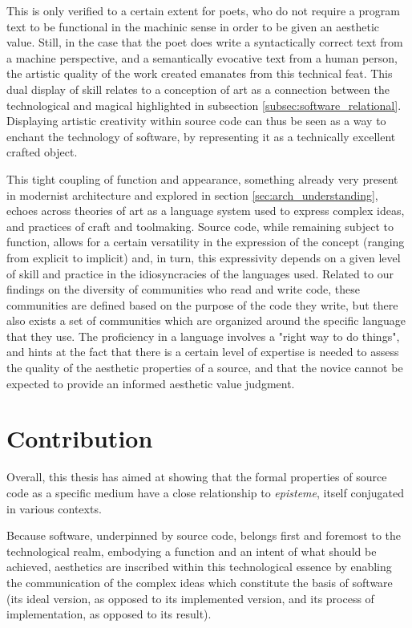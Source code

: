This is only verified to a certain extent for poets, who do not require a program text to be functional in the machinic sense in order to be given an aesthetic value. Still, in the case that the poet does write a syntactically correct text from a machine perspective, and a semantically evocative text from a human person, the artistic quality of the work created emanates from this technical feat. This dual display of skill relates to a conception of art as a connection between the technological and magical highlighted in subsection \ref{subsec:software_relational}. Displaying artistic creativity within source code can thus be seen as a way to enchant the technology of software, by representing it as a technically excellent crafted object.

This tight coupling of function and appearance, something already very present in modernist architecture and explored in section \ref{sec:arch_understanding}, echoes across theories of art as a language system used to express complex ideas, and practices of craft and toolmaking. Source code, while remaining subject to function, allows for a certain versatility in the expression of the concept (ranging from explicit to implicit) and, in turn, this expressivity depends on a given level of skill and practice in the idiosyncracies of the languages used. Related to our findings on the diversity of communities who read and write code, these communities are defined based on the purpose of the code they write, but there also exists a set of communities which are organized around the specific language that they use. The proficiency in a language involves a "right way to do things", and hints at the fact that there is a certain level of expertise is needed to assess the quality of the aesthetic properties of a source, and that the novice cannot be expected to provide an informed aesthetic value judgment.

\section{Contribution}  %

Overall, this thesis has aimed at showing that the formal properties of source code as a specific medium have a close relationship to \emph{episteme}, itself conjugated in various contexts.

Because software, underpinned by source code, belongs first and foremost to the technological realm, embodying a function and an intent of what should be achieved, aesthetics are inscribed within this technological essence by enabling the communication of the complex ideas which constitute the basis of software (its ideal version, as opposed to its implemented version, and its process of implementation, as opposed to its result).

